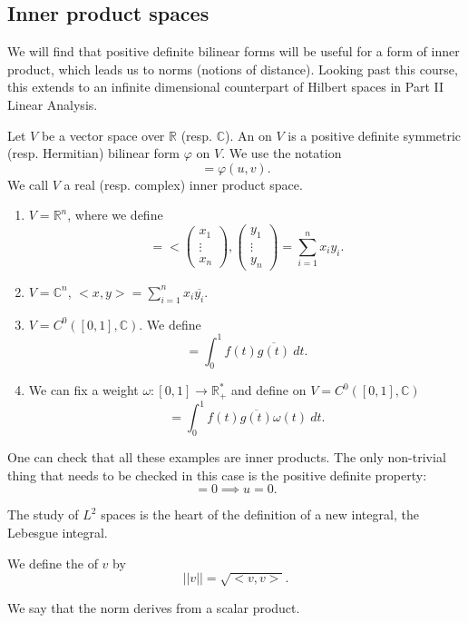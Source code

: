\documentclass[a4paper]{scrartcl}
\begin{document}
\subsection{Inner product spaces}
We will find that positive definite bilinear forms will be useful for a form of inner product, which leads us to norms (notions of distance). Looking past this course, this extends to an infinite dimensional counterpart of Hilbert spaces in Part II Linear Analysis.
\begin{definition}
      Let $V$ be a vector space over $\mathbb{R}$ (resp. $\mathbb{C}$). An  on $V$ is a positive definite symmetric (resp. Hermitian) bilinear form $\varphi$ on $V$. We use the notation 
      \[<u,v>=\varphi \left(u,v\right).\]
      We call $V$ a real (resp. complex) inner product space.
\end{definition}
\begin{example}
      \begin{enumerate}
           \item $V=\mathbb{R}^{n} $, where we define 
           \[<x,y>=<\begin{pmatrix}
           x_1\\\vdots\\x_n
           \end{pmatrix}, \begin{pmatrix}
           y_1\\\vdots\\y_n
           \end{pmatrix}
           =\sum_{i=1}^{n}x_i y_i
           .\]
           \item $V=\mathbb{C}^n$, $<x,y>=\sum_{i=1}^{n}x_i \overline{y_i} $.
           \item $V=C^{0} \left([0,1],\mathbb{C}\right)$. We define 
           \[<f,g>=\int_{0}^{1}f \left(t\right)\overline{g \left(t\right)} \ dt.\]
           \item We can fix a weight $\omega: [0,1] \rightarrow \mathbb{R}^*_+$ and define on $V=C^{0} \left([0,1],\mathbb{C}\right)$ 
           \[<f,g>=\int_{0}^{1}f \left(t\right)\overline{g \left(t\right)} \omega \left(t\right) \ dt.\]
      \end{enumerate}
      One can check that all these examples are inner products. The only non-trivial thing that needs to be checked in this case is the positive definite property: 
      \[<u,u>=0 \implies u=0.\]
\end{example}
\begin{remark}
      The study of $L^2$ spaces is the heart of the definition of a new integral, the Lebesgue integral.
\end{remark}

\begin{definition}
      We define the  of $v$ by 
      \[||v||=\sqrt{<v,v>}.\]
\end{definition}
\begin{remark}
      We say that the norm derives from a scalar product.
\end{remark}
\end{document}
